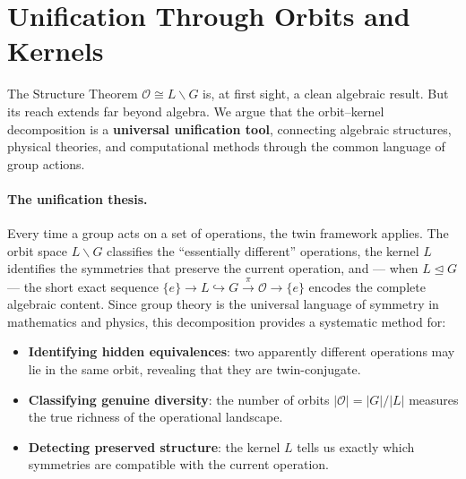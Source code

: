 \documentclass[11pt,a4paper,openany]{book}
\theoremstyle{plain}
\theoremstyle{definition}
\newcommand{\opspace}{\mathcal{O}}
\newcommand{\lingroup}{L}
\newcommand{\groupG}{G}
\begin{document}
\section{Unification Through Orbits and Kernels}

The Structure Theorem $\opspace \cong \lingroup\backslash\groupG$ is, at first sight, a clean algebraic result. But its reach extends far beyond algebra. We argue that the orbit--kernel decomposition is a \textbf{universal unification tool}, connecting algebraic structures, physical theories, and computational methods through the common language of group actions.

\paragraph{The unification thesis.} Every time a group acts on a set of operations, the twin framework applies. The orbit space $\lingroup\backslash\groupG$ classifies the ``essentially different'' operations, the kernel $\lingroup$ identifies the symmetries that preserve the current operation, and --- when $\lingroup\trianglelefteq\groupG$ --- the short exact sequence $\{e\} \to \lingroup \hookrightarrow \groupG \xrightarrow{\pi} \opspace \to \{e\}$ encodes the complete algebraic content. Since group theory is the universal language of symmetry in mathematics and physics, this decomposition provides a systematic method for:
\begin{itemize}
\item \textbf{Identifying hidden equivalences}: two apparently different operations may lie in the same orbit, revealing that they are twin-conjugate.
\item \textbf{Classifying genuine diversity}: the number of orbits $|\opspace| = |\groupG|/|\lingroup|$ measures the true richness of the operational landscape.
\item \textbf{Detecting preserved structure}: the kernel $\lingroup$ tells us exactly which symmetries are compatible with the current operation.
\end{itemize}
\end{document}
